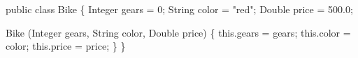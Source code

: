 \documentclass[fancy, oneside, mastersfancy, ms]{byuthesis}
\newenvironment{Shaded}{\begin{snugshade}}{\end{snugshade}}
\newcommand{\BuiltInTok}[1]{\textcolor[rgb]{0.00,0.23,0.31}{#1}}
\newcommand{\DecValTok}[1]{\textcolor[rgb]{0.68,0.00,0.00}{#1}}
\newcommand{\FloatTok}[1]{\textcolor[rgb]{0.68,0.00,0.00}{#1}}
\newcommand{\FunctionTok}[1]{\textcolor[rgb]{0.28,0.35,0.67}{#1}}
\newcommand{\KeywordTok}[1]{\textcolor[rgb]{0.00,0.23,0.31}{#1}}
\newcommand{\NormalTok}[1]{\textcolor[rgb]{0.00,0.23,0.31}{#1}}
\newcommand{\OperatorTok}[1]{\textcolor[rgb]{0.37,0.37,0.37}{#1}}
\newcommand{\StringTok}[1]{\textcolor[rgb]{0.13,0.47,0.30}{#1}}
\begin{document}
\begin{Shaded}
\begin{Highlighting}[]
\KeywordTok{public} \KeywordTok{class}\NormalTok{ Bike }\OperatorTok{\{}
    \BuiltInTok{Integer}\NormalTok{ gears }\OperatorTok{=} \DecValTok{0}\OperatorTok{;}
    \BuiltInTok{String}\NormalTok{ color }\OperatorTok{=} \StringTok{"red"}\OperatorTok{;}
    \BuiltInTok{Double}\NormalTok{ price }\OperatorTok{=} \FloatTok{500.0}\OperatorTok{;}

    \FunctionTok{Bike} \OperatorTok{(}\BuiltInTok{Integer}\NormalTok{ gears}\OperatorTok{,} \BuiltInTok{String}\NormalTok{ color}\OperatorTok{,} \BuiltInTok{Double}\NormalTok{ price}\OperatorTok{)} \OperatorTok{\{}
        \KeywordTok{this}\OperatorTok{.}\FunctionTok{gears} \OperatorTok{=}\NormalTok{ gears}\OperatorTok{;}
        \KeywordTok{this}\OperatorTok{.}\FunctionTok{color} \OperatorTok{=}\NormalTok{ color}\OperatorTok{;}
        \KeywordTok{this}\OperatorTok{.}\FunctionTok{price} \OperatorTok{=}\NormalTok{ price}\OperatorTok{;}
    \OperatorTok{\}}
\OperatorTok{\}}
\end{Highlighting}
\end{Shaded}
\end{document}
